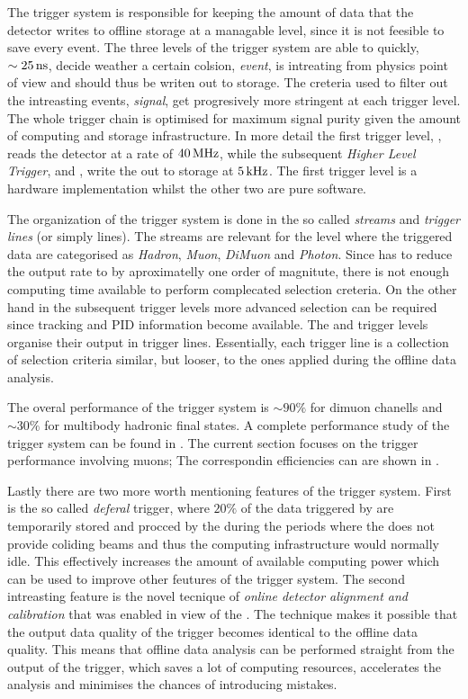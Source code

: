 The trigger system is responsible for keeping the amount of data that the detector writes to offline storage
at a managable level, since it is not feesible to save every event. The three levels of the \lhcb trigger system
are able to quickly, $\sim 25{\rm \,ns}$, decide weather a certain colsion, {\it event}, is intreating from physics point
of view and should thus be writen out to storage. The creteria used to filter out the intreasting events, {\it signal}, get
progresively more stringent at each trigger level. The whole trigger chain is optimised for maximum
signal purity given the amount of computing and storage infrastructure. In more detail the first trigger
level, \lzero, reads the detector at a rate of $40{\rm \,MHz}$, while the subsequent {\it Higher Level Trigger},
\hltone and \hlttwo, write the out to storage at $5{\rm \,kHz}$. The first trigger level is a hardware implementation
whilst the other two are pure software.

The organization of the trigger system is done in the so called {\it streams} and {\it trigger lines} (or simply lines).
The streams are relevant for the \lzero level where the triggered data are categorised as {\it Hadron}, {\it Muon},
{\it DiMuon} and {\it Photon}. Since \lzero has to reduce the output rate to \hltone by aproximatelly one order of
magnitute, there is not enough computing time available to perform complecated selection creteria. On the other
hand in the subsequent trigger levels more advanced selection can be required since tracking and PID information
become available. The \hltone and \hlttwo trigger levels organise their output in trigger lines. Essentially,
each trigger line is a collection of selection criteria similar, but looser, to the ones applied during the
offline data analysis.

The overal performance of the \lhcb trigger system is $\sim 90\%$ for dimuon chanells and $\sim 30\%$ for
multibody hadronic final states. A complete performance study of the trigger system can be found in \cite{}.
The current section focuses on the trigger performance involving muons; The correspondin efficiencies can
are shown in \figref{}.

Lastly there are two more worth mentioning features of the \lhcb trigger system. First is the so called
{\it deferal} trigger, where $20\%$ of the data triggered by \lzero are temporarily stored and procced by the \hltone
during the periods where the \lhc does not provide coliding beams and thus the \lhcb computing infrastructure
would normally idle. This effectively increases the amount of available computing power which can be used
to improve other feutures of the trigger system. The second intreasting feature is the novel tecnique of
{\it online detector alignment and calibration} that was enabled in view of the \runtwo. The technique
makes it possible that the output data quality of the trigger becomes identical to the offline data quality.
This means that offline data analysis can be performed straight from the output of the trigger, which saves
a lot of computing resources, accelerates the analysis and minimises the chances of introducing mistakes.

